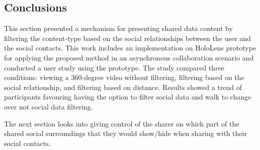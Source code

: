 


\subsection{Conclusions}

This section presented a mechanism for presenting shared data content by filtering the content-type based on the social relationships between the user and the social contacts. This work includes an implementation on HoloLens prototype for applying the proposed method in an asynchronous collaboration scenario and conducted a user study using the prototype. The study compared three conditions: viewing a 360-degree video without filtering, filtering based on the social relationship, and filtering based on distance. Results showed a trend of participants favouring having the option to filter social data and walk to change over not social data filtering. 

The next section looks into giving control of the sharer on which part of the shared social surroundings that they would show/hide when sharing with their social contacts. 